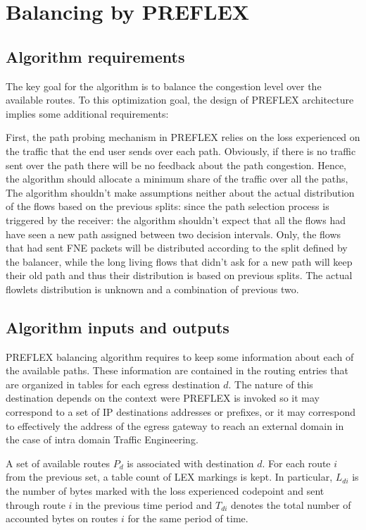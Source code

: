 \section{Balancing by PREFLEX}

\subsection{Algorithm requirements}
The key goal for the algorithm is to balance the congestion level over the available routes. To this optimization goal, the design of PREFLEX architecture implies some additional requirements: 

First, the path probing mechanism in PREFLEX relies on the loss experienced on the traffic that the end user sends over each path. Obviously, if  there is no traffic sent over the path there will be no feedback about the path congestion. Hence, the algorithm should allocate a minimum share of the traffic over all the paths,
The algorithm shouldn't make assumptions neither about the actual distribution of the flows based on the previous splits: since the path selection process is triggered by the receiver: the algorithm shouldn't expect that all the flows had have seen a new path assigned between two decision intervals. Only, the flows that had sent FNE packets will be distributed according to the split defined by the balancer, while the long living flows that didn't ask for a new path will keep their old path and thus their distribution is based on previous splits. The actual flowlets distribution is unknown and a combination of previous two.

\subsection{Algorithm inputs and outputs}

PREFLEX balancing algorithm requires to keep some information about each of the available paths. These information are contained in the routing entries that are organized in tables for each egress destination $d$. The nature of this destination depends on the context were PREFLEX is invoked so it may correspond to a set of IP destinations addresses or prefixes, or it may correspond to effectively the  address of the egress gateway to reach an external domain in the case of intra domain Traffic Engineering. 

A set of available routes $P_{d}$ is associated with destination $d$. For each route $i$ from the previous set, a table count of LEX markings is kept. In particular, $L_{di}$ is the number of bytes marked with the loss experienced codepoint and sent through route $i$ in the previous time period and $T_{di}$ denotes the total number of accounted bytes on routes $i$ for the same period of time. 

